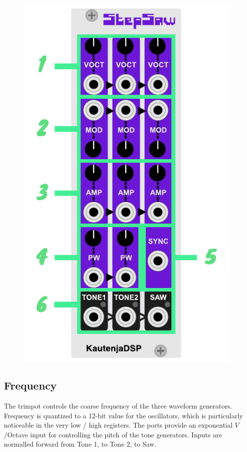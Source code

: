 \documentclass[12pt,letter]{article}
\begin{document}
\begin{figure}[!htp]
\centering
\includegraphics{img/Interface}
\end{figure}

\subsection{Frequency}

The trimpot controls the coarse frequency of the three waveform generators. Frequency is quantized to a 12-bit value for the oscillators, which is particularly noticeable in the very low / high registers. The ports provide an exponential $V$/Octave input for controlling the pitch of the tone generators. Inputs are normalled forward from Tone 1, to Tone 2, to Saw.
\end{document}
